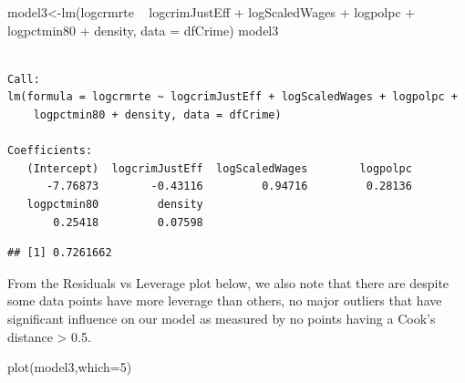 \documentclass[]{article}
\newenvironment{Shaded}{}{}
\newcommand{\DataTypeTok}[1]{#1}
\newcommand{\DecValTok}[1]{#1}
\newcommand{\KeywordTok}[1]{\textcolor[rgb]{0.00,0.00,1.00}{#1}}
\newcommand{\NormalTok}[1]{#1}
\newcommand{\OperatorTok}[1]{#1}
\newcommand{\StringTok}[1]{\textcolor[rgb]{0.00,0.50,0.50}{#1}}
\begin{document}
\begin{Shaded}
\begin{Highlighting}[]
\NormalTok{model3<-}\KeywordTok{lm}\NormalTok{(logcrmrte }\OperatorTok{~}\StringTok{ }\NormalTok{logcrimJustEff }\OperatorTok{+}\StringTok{ }\NormalTok{logScaledWages }\OperatorTok{+}\StringTok{  }\NormalTok{logpolpc  }
              \OperatorTok{+}\StringTok{ }\NormalTok{logpctmin80 }\OperatorTok{+}\StringTok{ }\NormalTok{density, }\DataTypeTok{data =}\NormalTok{ dfCrime)}
\NormalTok{model3}
\end{Highlighting}
\end{Shaded}

\begin{verbatim}

Call:
lm(formula = logcrmrte ~ logcrimJustEff + logScaledWages + logpolpc + 
    logpctmin80 + density, data = dfCrime)

Coefficients:
   (Intercept)  logcrimJustEff  logScaledWages        logpolpc  
      -7.76873        -0.43116         0.94716         0.28136  
   logpctmin80         density  
       0.25418         0.07598  
\end{verbatim}

\begin{Shaded}
\end{Shaded}

\begin{verbatim}
## [1] 0.7261662
\end{verbatim}

From the Residuals vs Leverage plot below, we also note that there are
despite some data points have more leverage than others, no major
outliers that have significant influence on our model as measured by no
points having a Cook's distance \textgreater{} 0.5.

\begin{Shaded}
\begin{Highlighting}[]
\KeywordTok{plot}\NormalTok{(model3,}\DataTypeTok{which=}\DecValTok{5}\NormalTok{)}
\end{Highlighting}
\end{Shaded}
\end{document}
